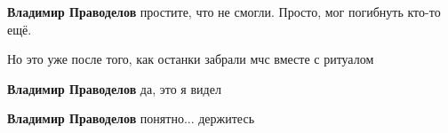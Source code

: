 \raggedcolumns
\begin{multicols}{2} %
\setlength{\parindent}{0pt}

\begin{itemize} %

\textbf{Владимир Праводелов} простите, что не смогли. Просто, мог погибнуть кто-то ещё.

Но это уже после того, как останки забрали мчс вместе с ритуалом

\textbf{Владимир Праводелов} да, это я видел

\textbf{Владимир Праводелов} понятно... держитесь

\end{itemize} %
\end{multicols} %

